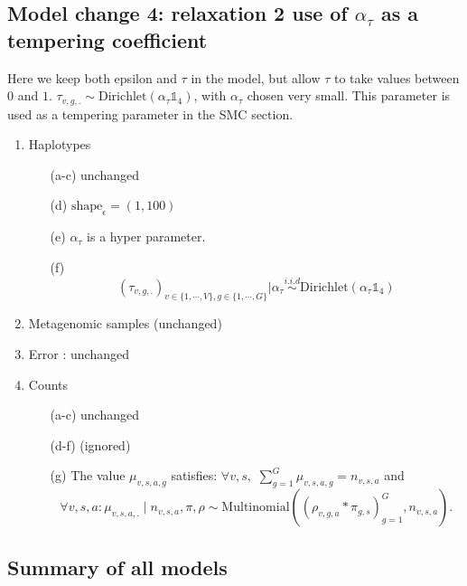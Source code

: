 \documentclass{article}
\begin{document}
\subsection{Model change 4: relaxation 2 use of $\alpha_\tau$ as a tempering coefficient}
Here we keep both epsilon and $\tau$ in the model, but allow $\tau$ to take values between $0$ and $1$. $\tau_{v,g,.}\sim \mathrm{Dirichlet}(\alpha_\tau\mathds{1}_4)$, with $\alpha_\tau$ chosen very small. This parameter is used as a tempering parameter in the SMC section.

\begin{enumerate}[1.]
    \item Haplotypes
    \begin{enumerate}
    \item[(a-c)] unchanged
    \item[(d)] $\mathrm{shape}_{\epsilon}=(1,100)$
    \item[(e)] $\alpha_{\tau}$ is a hyper parameter.
    \item[(f)] $$\left(\tau_{v,g,.}\right)_{v\in\{1,\cdots,V\},g\in\{1,\cdots,G\}}|\alpha_{\tau}\overset{i.i.d }{\sim}\mathrm{Dirichlet}(\alpha_{\tau}\mathds{1}_4)$$
    
    \end{enumerate}
    \item Metagenomic samples (unchanged)
    \item Error : unchanged
    \item Counts
    \begin{enumerate}

\item[(a-c)] unchanged
    \item [(d-f)] (ignored)
     \item[(g)] The value $\mu_{v,s,a,g}$ satisfies: $\forall v,s,$  $\sum_{g=1}^G\mu_{v,s,a,g}=n_{v,s,a}$ and
    $$\forall v,s,a : \mu_{v,s,a,.} \mid n_{v,s,a},\pi, \rho \sim \mathrm{Multinomial}\left(\left(\rho_{v,g,a}*\pi_{g,s}\right)_{g=1}^G,n_{v,s,a}\right).$$
    

\end{enumerate}




\end{enumerate}


\subsection{Summary of all models}
\end{document}
